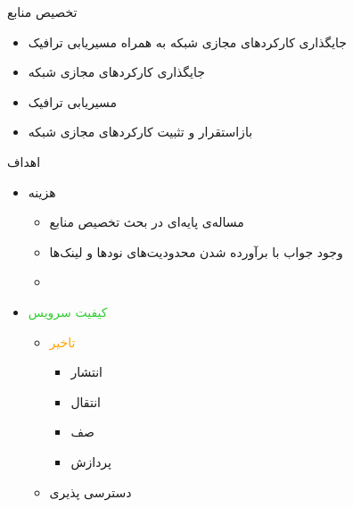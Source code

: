 \documentclass[dvipsnames]{beamer}
\makeatletter
\newcommand{\RTList}{\raggedleft\rightskip\@totalleftmargin}
\makeatother
\begin{document}
\begin{persian}
	\begin{frame}{تخصیص منابع}
		\begin{itemize}\RTList{}
			\justifying
			\item
						جایگذاری کارکردهای مجازی شبکه به همراه مسیریابی ترافیک\\
						\begin{center}\footnotesize{}\end{center}
			\item
						جایگذاری کارکردهای مجازی شبکه\\
						\begin{center}\footnotesize{}\end{center}
			\item
						مسیریابی ترافیک\\
						\begin{center}\footnotesize{}\end{center}
			\item
						بازاستقرار و تثبیت کارکردهای مجازی شبکه\\
						\begin{center}\footnotesize{}\end{center}
		\end{itemize}
	\end{frame}

	\begin{frame}{اهداف}
		\begin{itemize}\RTList{}
			\justifying%
			\item هزینه
						\begin{itemize}\RTList{}
							\item مساله‌ی پایه‌ای در بحث تخصیص منابع
							\item وجود جواب با برآورده شدن محدودیت‌های نودها و لینک‌ها
							\item {}
						\end{itemize}
			\item \textcolor{LimeGreen}{کیفیت سرویس}
						\begin{itemize}\RTList{}
							\item \textcolor{Orange}{تاخیر}
						\begin{itemize}\RTList{}
							\item انتشار
							\item انتقال
							\item صف
							\item پردازش
						\end{itemize}
							\item دسترسی پذیری
						\end{itemize}
		\end{itemize}
	\end{frame}


\end{persian}
\end{document}
